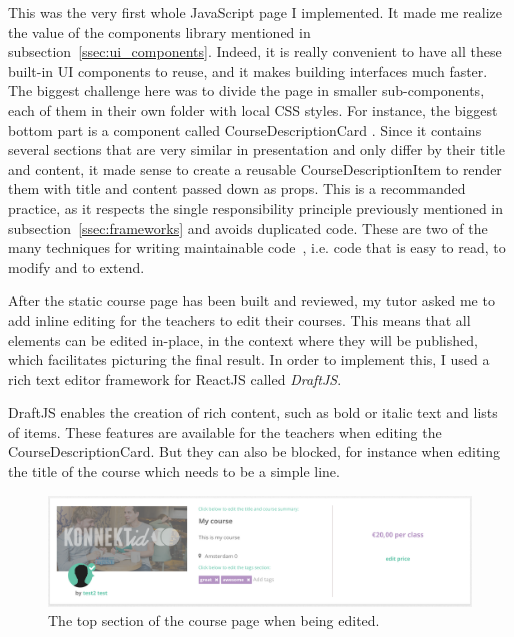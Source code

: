 This was the very first whole JavaScript page I implemented. It made me realize the value of the components library mentioned in {\sc subsection}~\ref{ssec:ui_components}.
Indeed, it is really convenient to have all these built-in UI components to reuse, and it makes building interfaces much faster. The biggest challenge here was to divide
the page in smaller sub-components, each of them in their own folder with local CSS styles. For instance, the biggest bottom part is a component called
\guillemotleft{} CourseDescriptionCard \guillemotright{}. Since it contains several sections that are very similar in presentation and only differ by their title and content,
it made sense to create a reusable \guillemotleft{} CourseDescriptionItem \guillemotright{} to render them with title and content passed down as props. This is a recommanded
practice, as it respects the single responsibility principle previously mentioned in {\sc subsection}~\ref{ssec:frameworks} and avoids duplicated code.
These are two of the many techniques for writing maintainable code~\cite{maintainable}, i.e. code that is easy to read, to modify and to extend.

After the static course page has been built and reviewed, my tutor asked me to add inline editing for the teachers to edit their courses.
This means that all elements can be edited in-place, in the context where they will be published, which facilitates picturing the final result.
In order to implement this, I used a rich text editor framework for ReactJS called \textit{DraftJS}.

DraftJS enables the creation of rich content, such as bold or italic text and lists of items. These features are available for the teachers when editing the
CourseDescriptionCard. But they can also be blocked, for instance when editing the title of the course which needs to be a simple line.

\begin{figure}[H]
    \centering
    \includegraphics[scale=0.8]{figure/courseEditIntro.png}
    \caption{The top section of the course page when being edited.}
    \label{fig:courseEditIntro}
\end{figure}

